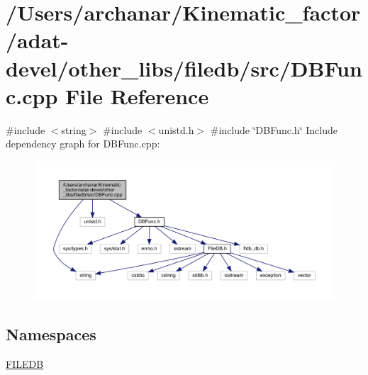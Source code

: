 \hypertarget{adat-devel_2other__libs_2filedb_2src_2DBFunc_8cpp}{}\section{/\+Users/archanar/\+Kinematic\+\_\+factor/adat-\/devel/other\+\_\+libs/filedb/src/\+D\+B\+Func.cpp File Reference}
\label{adat-devel_2other__libs_2filedb_2src_2DBFunc_8cpp}
{\ttfamily \#include $<$string$>$}\newline
{\ttfamily \#include $<$unistd.\+h$>$}\newline
{\ttfamily \#include \char`\"{}D\+B\+Func.\+h\char`\"{}}\newline
Include dependency graph for D\+B\+Func.\+cpp\+:
\nopagebreak
\begin{figure}[H]
\begin{center}
\leavevmode
\includegraphics[width=350pt]{df/d83/adat-devel_2other__libs_2filedb_2src_2DBFunc_8cpp__incl}
\end{center}
\end{figure}
\subsection*{Namespaces}
\begin{DoxyCompactItemize}
\item 
 \mbox{\hyperlink{namespaceFILEDB}{F\+I\+L\+E\+DB}}
\end{DoxyCompactItemize}
